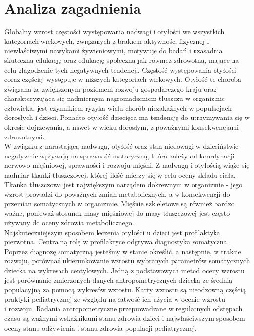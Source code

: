\documentclass{article}
\begin{document}
\section{Analiza zagadnienia}

Globalny wzrost częstości występowania nadwagi i otyłości we wszystkich kategoriach wiekowych, związanych z brakiem aktywności fizycznej i niewłaściwymi nawykami żywieniowymi, motywuje do badań i uzasadnia skuteczną edukację oraz edukację społeczną jak również zdrowotną, mające na celu złagodzenie tych negatywnych tendencji. Częstość występowania otyłości coraz częściej występuje w niższych kategoriach wiekowych. Otyłość to choroba związana ze zwiększonym poziomem rozwoju gospodarczego kraju oraz charakteryzująca się nadmiernym nagromadzeniem tłuszczu w organizmie człowieka, jest czynnikiem ryzyka wielu chorób niezakaźnych w populacjach dorosłych i dzieci. Ponadto otyłość dziecięca ma tendencję do utrzymywania się w okresie dojrzewania, a nawet w wieku dorosłym, z poważnymi konsekwencjami zdrowotnymi.\\
W związku z narastającą nadwagą, otyłość oraz stan niedowagi w dzieciństwie negatywnie wpływają na sprawność motoryczną, która zależy od koordynacji nerwowo-mięśniowej, sprawności i rozwoju mięśni.
Z nadwagą i otyłością wiąże się nadmiar tkanki tłuszczowej, której ilość mierzy się w celu oceny składu ciała. Tkanka tłuszczowa jest największym narządem dokrewnym w organizmie - jego wzrost prowadzi do poważnych zmian metabolicznych, a w konsekwencji do przemian somatycznych w organizmie. Mięśnie szkieletowe są również bardzo ważne, ponieważ stosunek masy mięśniowej do masy tłuszczowej jest często używany do oceny zdrowia metabolicznego.\\
Najskuteczniejszym sposobem leczenia otyłości u dzieci jest profilaktyka pierwotna. Centralną rolę w profilaktyce odgrywa diagnostyka somatyczna. Poprzez diagnozę somatyczną jesteśmy w stanie określić, a następnie, w trakcie rozwoju, porównać ukierunkowanie wzrostu wybranych parametrów somatycznych dziecka na wykresach centylowych. Jedną z podstawowych metod oceny wzrostu jest porównanie zmierzonych danych antropometrycznych dziecka ze średnią populacyjną za pomocą wykresów wzrostu. Karty wzrostu są nieodzowną częścią praktyki pediatrycznej ze względu na łatwość ich użycia w ocenie wzrostu\\i rozwoju. Badania antropometryczne przeprowadzane w regularnych odstępach czasu są ważnymi wskaźnikami stanu zdrowia dzieci i najwłaściwszym sposobem oceny stanu odżywienia i stanu zdrowia populacji pediatrycznej.\\ \\
\end{document}
